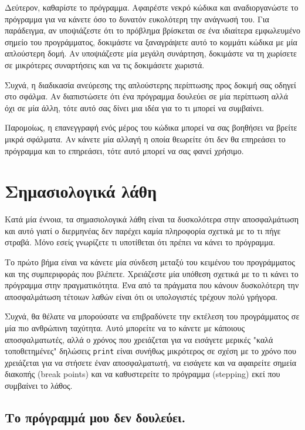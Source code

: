 \documentclass[10pt]{book}
\begin{document}
Δεύτερον, καθαρίστε το πρόγραμμα.  Αφαιρέστε νεκρό κώδικα και αναδιοργανώστε το πρόγραμμα για να κάνετε όσο το δυνατόν
ευκολότερη την ανάγνωσή του.  Για παράδειγμα, αν υποψιάζεστε ότι το πρόβλημα βρίσκεται σε ένα ιδιαίτερα εμφωλευμένο σημείο
του προγράμματος, δοκιμάστε να ξαναγράψετε αυτό το κομμάτι κώδικα με μία απλούστερη δομή.  Αν υποψιάζεστε μία μεγάλη
συνάρτηση, δοκιμάστε να τη χωρίσετε σε μικρότερες συναρτήσεις και να τις δοκιμάσετε χωριστά.

Συχνά, η διαδικασία ανεύρεσης της απλούστερης περίπτωσης προς δοκιμή σας οδηγεί στο σφάλμα.  Αν διαπιστώσετε ότι ένα
πρόγραμμα δουλεύει σε μία περίπτωση αλλά όχι σε μία άλλη, τότε αυτό σας δίνει μια ιδέα για το τι μπορεί να συμβαίνει.

Παρομοίως, η επανεγγραφή ενός μέρος του κώδικα μπορεί να σας βοηθήσει να βρείτε μικρά σφάλματα.  Αν κάνετε μία αλλαγή
η οποία θεωρείτε ότι δεν θα επηρεάσει το πρόγραμμα και το επηρεάσει, τότε αυτό μπορεί να σας φανεί χρήσιμο.



\section{Σημασιολογικά λάθη}

Κατά μία έννοια, τα σημασιολογικά λάθη είναι τα δυσκολότερα στην αποσφαλμάτωση και αυτό γιατί
ο διερμηνέας δεν παρέχει καμία πληροφορία σχετικά με το τι πήγε στραβά.  Μόνο εσείς γνωρίζετε
τι υποτίθεται ότι πρέπει να κάνει το πρόγραμμα.

Το πρώτο βήμα είναι να κάνετε μία σύνδεση μεταξύ του κειμένου του προγράμματος και της συμπεριφοράς
που βλέπετε.  Χρειάζεστε μία υπόθεση σχετικά με το τι κάνει το πρόγραμμα στην πραγματικότητα.  Ένα
από τα πράγματα που κάνουν δυσκολότερη την αποσφαλμάτωση τέτοιων λαθών είναι ότι οι υπολογιστές
τρέχουν πολύ γρήγορα.

Συχνά, θα θέλατε να μπορούσατε να επιβραδύνετε την εκτέλεση του προγράμματος σε μία πιο
ανθρώπινη ταχύτητα.  Αυτό μπορείτε να το κάνετε με κάποιους αποσφαλματωτές, αλλά ο χρόνος
που χρειάζεται για να εισάγετε μερικές "καλά τοποθετημένες" δηλώσεις {\tt print} είναι συνήθως
μικρότερος σε σχέση με το χρόνο που χρειάζεται για να στήσετε έναν αποσφαλματωτή, να εισάγετε
και να αφαιρείτε σημεία διακοπής (break points) και να καθυστερείτε το πρόγραμμα (stepping)
εκεί που συμβαίνει το λάθος.


\subsection{Το πρόγραμμά μου δεν δουλεύει.}
\end{document}
